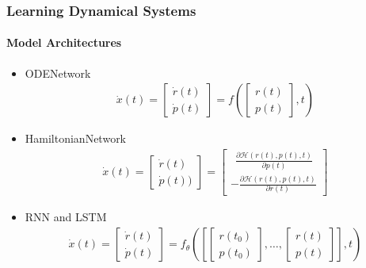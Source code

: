 \documentclass[usenames, dvipsnames, t]{beamer}
\begin{document}
\begin{frame}
	\frametitle{Learning Dynamical Systems}
	\framesubtitle{Model Architectures}
	\begin{itemize}	
		\item<+-> ODENetwork
		\begin{align*}
			\dot{x}(t) =
			\begin{bmatrix}
				\dot{r}(t) \\ 
				\dot{p}(t)
			\end{bmatrix}
			= f \left(
			\begin{bmatrix}
				r(t) \\ 
				p(t)
			\end{bmatrix}
			,t
			\right)
		\end{align*}
		\item<+-> HamiltonianNetwork
		\begin{align*}
			\dot{x}(t) = 
			\begin{bmatrix}
				\dot{r}(t) \\ \dot{p}(t)) 
			\end{bmatrix}
			= 
			\begin{bmatrix}
			\ \ \frac{\partial \mathcal{H}(r(t), p(t), t)}{\partial p(t)} \\ - \frac{\partial \mathcal{H}(r(t), p(t), t)}{\partial r(t)}
			\end{bmatrix}
		\end{align*}
		\item<+-> RNN and LSTM
		\begin{align*}
			\dot{x}(t) =
			\begin{bmatrix}
				\dot{r}(t) \\ 
				\dot{p}(t)
			\end{bmatrix}
			= f_\theta \left(
			\left[
			\begin{bmatrix}
				r(t_0) \\ 
				p(t_0)
			\end{bmatrix},
			\ldots, 
			\begin{bmatrix}
				r(t) \\ 
				p(t)
			\end{bmatrix}
			\right]
			,t
			\right)
		\end{align*}
	\end{itemize}
\end{frame}
\end{document}
